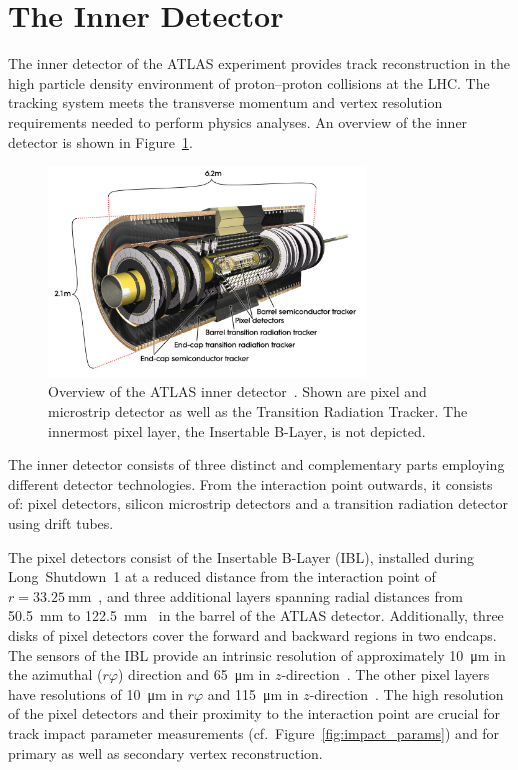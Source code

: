 \section{The Inner Detector}
\label{sec:atlas_tracking}

The inner detector of the ATLAS experiment provides track reconstruction in the
high particle density environment of proton--proton collisions at the LHC. The
tracking system meets the transverse momentum and vertex resolution requirements
needed to perform physics analyses. An overview of the inner detector is shown
in Figure~\ref{fig:atlas_indet}.

\begin{figure}[htb]
  \centering
  \includegraphics[width=0.75\textwidth]{./figures/atlas/inner_detector.jpg}
  \caption[Overview of the inner detector]{Overview of the ATLAS inner
    detector~\cite{indet_fig}. Shown are pixel and microstrip detector as well
    as the Transition Radiation Tracker. The innermost pixel layer, the
    Insertable B-Layer, is not depicted.}
  \label{fig:atlas_indet}
\end{figure}

The inner detector consists of three distinct and complementary parts employing
different detector technologies. From the interaction point outwards, it
consists of: pixel detectors, silicon microstrip detectors and a transition
radiation detector using drift tubes.

The pixel detectors consist of the Insertable B-Layer (IBL), installed during
Long~Shutdown~1 at a reduced distance from the interaction point
of~$r = \SI{33.25}{\milli\metre}$~\cite{ibl_tdr}, and three additional layers
spanning radial distances from \SI{50.5}{\milli\metre} to
\SI{122.5}{\milli\metre}~\cite{atlas_detector} in the barrel of the ATLAS
detector. Additionally, three disks of pixel detectors cover the forward and
backward regions in two endcaps. The sensors of the IBL provide an intrinsic
resolution of approximately \SI{10}{\micro\metre} in the azimuthal ($r\varphi$)
direction and \SI{65}{\micro\metre} in $z$-direction~\cite{ibl_measurement}. The
other pixel layers have resolutions of \SI{10}{\micro\metre} in $r\varphi$ and
\SI{115}{\micro\metre} in $z$-direction~\cite{atlas_detector}. The high
resolution of the pixel detectors and their proximity to the interaction point
are crucial for track impact parameter measurements (cf.\
Figure~\ref{fig:impact_params}) and for primary as well as secondary vertex
reconstruction.

